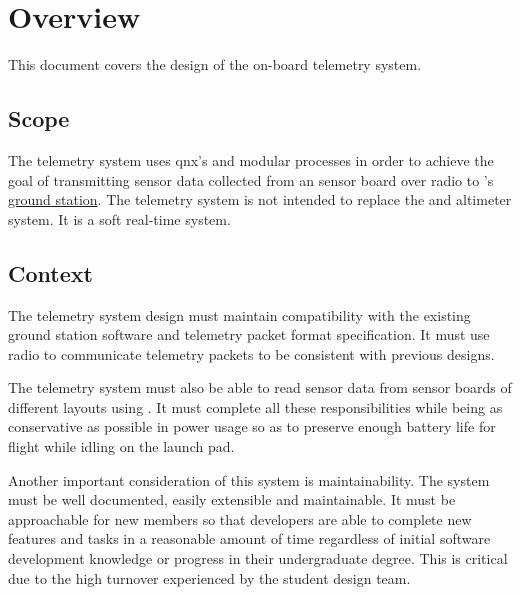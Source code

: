 \section{Overview}

This document covers the design of the  on-board telemetry system.

\subsection{Scope}

The telemetry system uses \gls{qnx}'s  and modular processes in order to achieve the goal of
transmitting sensor data collected from an  sensor board over  radio to
's  \hyperref[a:ground-station]{ground station}. The telemetry system is not
intended to replace the   and altimeter system. It is a soft real-time system.

\subsection{Context}

The  telemetry system design must maintain compatibility with the existing ground station
software and telemetry packet format specification. It must use  radio to communicate telemetry
packets to be consistent with previous designs.

The telemetry system must also be able to read sensor data from  sensor boards of different layouts
using . It must complete all these responsibilities while being as conservative as possible in power
usage so as to preserve enough battery life for flight while idling on the launch pad.

Another important consideration of this system is maintainability. The system must be well documented, easily
extensible and maintainable. It must be approachable for new  members so that developers are
able to complete new features and tasks in a reasonable amount of time regardless of initial software development
knowledge or progress in their undergraduate degree. This is critical due to the high turnover experienced by the
student design team.
